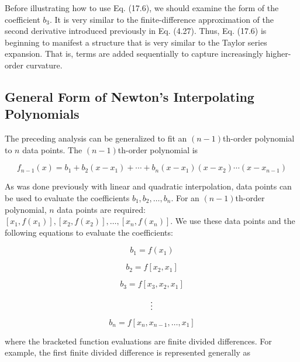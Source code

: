 \documentclass[../main.tex]{subfiles}
\begin{document}
Before illustrating how to use Eq. (17.6), we should examine the form of the coefficient $b_3$. It is very similar to the finite-difference approximation of the second derivative
introduced previously in Eq. (4.27). Thus, Eq. (17.6) is beginning to manifest a structure
that is very similar to the Taylor series expansion. That is, terms are added sequentially to
capture increasingly higher-order curvature.


\label{cha:cha_P_17_2_3} %
\subsection{General Form of Newton's Interpolating Polynomials}

\noindent The preceding analysis can be generalized to fit an $(n - 1)$th-order polynomial to $n$ data
points. The $(n - 1)$th-order polynomial is

\begin{equation}
	\tag{17.10}
	f_{n-1}(x) = b_1 + b_2 (x - x_1) + \cdots + b_n (x - x_1) (x - x_2) \cdots (x - x_{n-1})
\end{equation}

\noindent As was done previously with linear and quadratic interpolation, data points can be used to
evaluate the coefficients $b_1 , b_2 , \dots , b_n$. For an $(n - 1)$th-order polynomial, $n$ data points
are required: $[x_1 , f (x_1)], [x_2 , f (x_2)], \dots , [x_n , f (x_n )]$. We use these data points and the
following equations to evaluate the coefficients:

\begin{equation}
	\tag{17.11}
	b_1 = f(x_1)
\end{equation}

\begin{equation}
	\tag{17.12}
	b_2 = f[x_2,x_1]
\end{equation}

\begin{equation}
	\tag{17.13}
	b_3 = f[x_3, x_2, x_1]
\end{equation}

\begin{equation}
	\notag
	\vdots 
\end{equation}

\begin{equation}
	\tag{17.14}
	b_n = f[x_n, x_{n-1}, \dots, x_1]
\end{equation}

\noindent where the bracketed function evaluations are finite divided differences. For example, the
first finite divided difference is represented generally as
\end{document}
